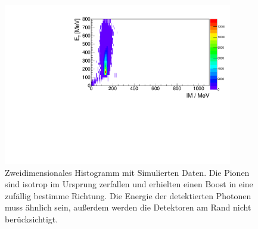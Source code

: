 \documentclass[a4paper,11pt,oneside,final,german,openbib,pdftex]{scrbook}
\begin{document}
{\begin{appendix}

\begin{figure}[h!]
	\begin{center}
		\includegraphics[width=100mm]{NewCalib/UrsprungIsotrop/20171904SimUrsprungIsotrop30DegreeCutHist}
		\caption[Simulation: 2D-Hist Isotroper Boost im Ursprung ohne Detektoren am Rand]{Zweidimensionales Histogramm mit Simulierten Daten. Die Pionen sind isotrop im Ursprung zerfallen und erhielten einen Boost in eine zuf\"allig bestimme Richtung. Die Energie der detektierten Photonen muss \"ahnlich sein, au{\ss}erdem werden die Detektoren am Rand nicht ber\"ucksichtigt.}
		\label{fig:Sim-Data-Ursprung-2DHist-30-Degree-Edge}
	\end{center}
\end{figure}


\end{appendix}}
\end{document}
